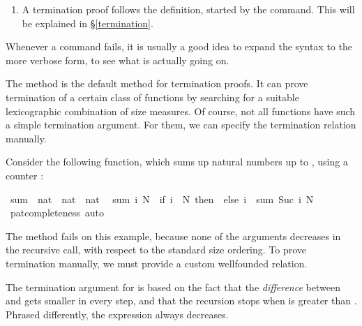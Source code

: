 \begin{isabellebody}
\begin{isamarkuptext}
\begin{enumerate}
  \item A termination proof follows the definition, started by the
   command. This will be explained in \S\ref{termination}.
 \end{enumerate}
  Whenever a  command fails, it is usually a good idea to
  expand the syntax to the more verbose  form, to see
  what is actually going on.%
\end{isamarkuptext}%
\isamarkuptrue%
%
\isamarkuptrue%
%
\begin{isamarkuptext}%
\label{termination}
  The method  is the default method for
  termination proofs. It can prove termination of a
  certain class of functions by searching for a suitable lexicographic
  combination of size measures. Of course, not all functions have such
  a simple termination argument. For them, we can specify the termination
  relation manually.%
\end{isamarkuptext}%
\isamarkuptrue%
%
\isamarkuptrue%
%
\begin{isamarkuptext}%
Consider the following function, which sums up natural numbers up to
  , using a counter :%
\end{isamarkuptext}%
\isamarkuptrue%
\isamarkupfalse%
\ sum\ {\isacharcolon}{\isacharcolon}\ {\isachardoublequoteopen}nat\ {\isasymRightarrow}\ nat\ {\isasymRightarrow}\ nat{\isachardoublequoteclose}\isanewline
{}\isanewline
\ \ {\isachardoublequoteopen}sum\ i\ N\ {\isacharequal}\ {\isacharparenleft}if\ i\ {\isachargreater}\ N\ then\ {}\ else\ i\ {\isacharplus}\ sum\ {\isacharparenleft}Suc\ i{\isacharparenright}\ N{\isacharparenright}{\isachardoublequoteclose}\isanewline
%
\isadelimproof
%
\endisadelimproof
%
\isatagproof
{}\isamarkupfalse%
\ pat{\isacharunderscore}completeness\ auto%
\endisatagproof
{\isafoldproof}%
%
\isadelimproof
%
\endisadelimproof
%
\begin{isamarkuptext}%
\noindent The  method fails on this example, because none of the
  arguments decreases in the recursive call, with respect to the standard size ordering.
  To prove termination manually, we must provide a custom wellfounded relation.

  The termination argument for  is based on the fact that
  the \emph{difference} between  and  gets
  smaller in every step, and that the recursion stops when 
  is greater than . Phrased differently, the expression 
   always decreases.


\end{isamarkuptext}
\end{isabellebody}
